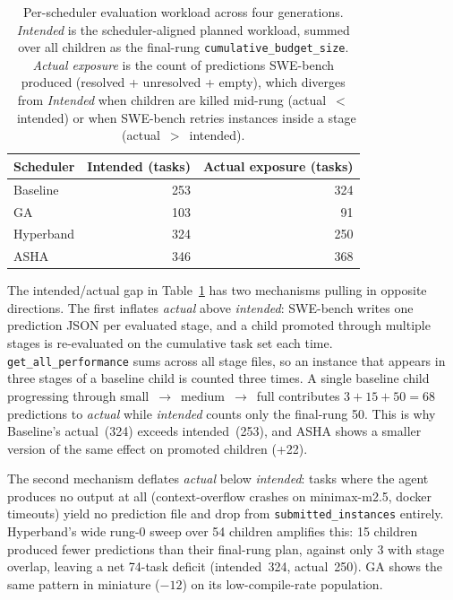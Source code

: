 \begin{table}[ht]
\centering
\caption{Per-scheduler evaluation workload across four generations.
\emph{Intended} is the scheduler-aligned planned workload, summed over
all children as the final-rung
\texttt{cumulative\_budget\_size}. \emph{Actual exposure} is the count
of predictions SWE-bench produced (resolved + unresolved + empty),
which diverges from \emph{Intended} when children are killed mid-rung
(actual~$<$~intended) or when SWE-bench retries instances inside a
stage (actual~$>$~intended).}
\label{tab:results-workload}
\begin{tabular}{lrr}
\hline
Scheduler & Intended (tasks) & Actual exposure (tasks) \\
\hline
Baseline  & 253 & 324 \\
GA        & 103 &  91 \\
Hyperband & 324 & 250 \\
ASHA      & 346 & 368 \\
\hline
\end{tabular}
\end{table}

The intended/actual gap in Table~\ref{tab:results-workload} has two
mechanisms pulling in opposite directions. The first inflates
\emph{actual} above \emph{intended}: SWE-bench writes one prediction
JSON per evaluated stage, and a child promoted through multiple stages
is re-evaluated on the cumulative task set each time.
\texttt{get\_all\_performance} sums across all stage files, so an
instance that appears in three stages of a baseline child is counted
three times. A single baseline child progressing through
small~$\to$~medium~$\to$~full contributes
$3 + 15 + 50 = 68$ predictions to \emph{actual} while \emph{intended}
counts only the final-rung 50. This is why Baseline's actual~(324)
exceeds intended~(253), and ASHA shows a smaller version of the same
effect on promoted children (+22).

The second mechanism deflates \emph{actual} below \emph{intended}:
tasks where the agent produces no output at all (context-overflow
crashes on minimax-m2.5, docker timeouts) yield no prediction file and
drop from \texttt{submitted\_instances} entirely. Hyperband's wide
rung-0 sweep over 54 children amplifies this: 15 children produced
fewer predictions than their final-rung plan, against only 3 with
stage overlap, leaving a net 74-task deficit (intended~324,
actual~250). GA shows the same pattern in miniature ($-12$) on its
low-compile-rate population.


